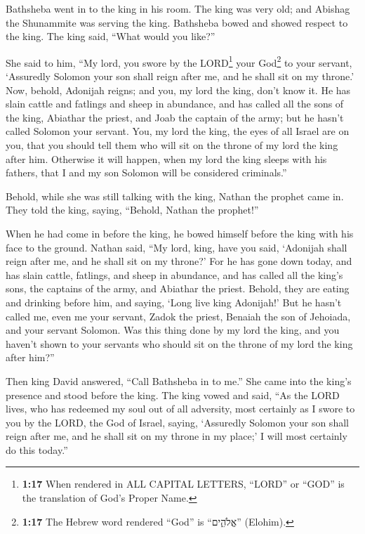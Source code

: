  Bathsheba went in to the king in his room. The king was
very old; and Abishag the Shunammite was serving the king.
 Bathsheba bowed and showed respect to the king. The king
said, ``What would you like?''

 She said to him, ``My lord, you swore by the
LORD\footnote{\textbf{1:17} When rendered in ALL CAPITAL LETTERS,
  ``LORD'' or ``GOD'' is the translation of God's Proper Name.} your
God\footnote{\textbf{1:17} The Hebrew word rendered ``God'' is
  ``אֱלֹהִ֑ים'' (Elohim).} to your servant, `Assuredly Solomon your son
shall reign after me, and he shall sit on my throne.' 
Now, behold, Adonijah reigns; and you, my lord the king, don't know it.
 He has slain cattle and fatlings and sheep in abundance,
and has called all the sons of the king, Abiathar the priest, and Joab
the captain of the army; but he hasn't called Solomon your servant.
 You, my lord the king, the eyes of all Israel are on
you, that you should tell them who will sit on the throne of my lord the
king after him.  Otherwise it will happen, when my lord
the king sleeps with his fathers, that I and my son Solomon will be
considered criminals.''

 Behold, while she was still talking with the king,
Nathan the prophet came in.  They told the king, saying,
``Behold, Nathan the prophet!''

When he had come in before the king, he bowed himself before the king
with his face to the ground.  Nathan said, ``My lord,
king, have you said, `Adonijah shall reign after me, and he shall sit on
my throne?'  For he has gone down today, and has slain
cattle, fatlings, and sheep in abundance, and has called all the king's
sons, the captains of the army, and Abiathar the priest. Behold, they
are eating and drinking before him, and saying, `Long live king
Adonijah!'  But he hasn't called me, even me your
servant, Zadok the priest, Benaiah the son of Jehoiada, and your servant
Solomon.  Was this thing done by my lord the king, and
you haven't shown to your servants who should sit on the throne of my
lord the king after him?''

 Then king David answered, ``Call Bathsheba in to me.''
She came into the king's presence and stood before the king.
 The king vowed and said, ``As the LORD lives, who has
redeemed my soul out of all adversity,  most certainly as
I swore to you by the LORD, the God of Israel, saying, `Assuredly
Solomon your son shall reign after me, and he shall sit on my throne in
my place;' I will most certainly do this today.''

